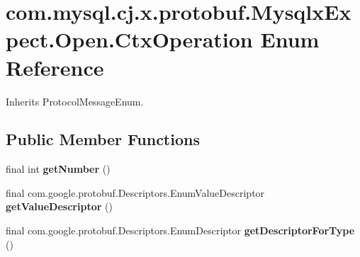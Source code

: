 \hypertarget{enumcom_1_1mysql_1_1cj_1_1x_1_1protobuf_1_1_mysqlx_expect_1_1_open_1_1_ctx_operation}{}\section{com.\+mysql.\+cj.\+x.\+protobuf.\+Mysqlx\+Expect.\+Open.\+Ctx\+Operation Enum Reference}
\label{enumcom_1_1mysql_1_1cj_1_1x_1_1protobuf_1_1_mysqlx_expect_1_1_open_1_1_ctx_operation}


Inherits Protocol\+Message\+Enum.

\subsection*{Public Member Functions}
\begin{DoxyCompactItemize}
\item 
\mbox{\label{enumcom_1_1mysql_1_1cj_1_1x_1_1protobuf_1_1_mysqlx_expect_1_1_open_1_1_ctx_operation_ad3133f273b8e3b47333269429b6bc0e3}} 
final int {\bfseries get\+Number} ()
\item 
\mbox{\label{enumcom_1_1mysql_1_1cj_1_1x_1_1protobuf_1_1_mysqlx_expect_1_1_open_1_1_ctx_operation_a4619c15662863227c70347f5f4810cb9}} 
final com.\+google.\+protobuf.\+Descriptors.\+Enum\+Value\+Descriptor {\bfseries get\+Value\+Descriptor} ()
\item 
\mbox{\label{enumcom_1_1mysql_1_1cj_1_1x_1_1protobuf_1_1_mysqlx_expect_1_1_open_1_1_ctx_operation_ad161dfef5abfdefe5940e32fd86b5fa7}} 
final com.\+google.\+protobuf.\+Descriptors.\+Enum\+Descriptor {\bfseries get\+Descriptor\+For\+Type} ()
\end{DoxyCompactItemize}
